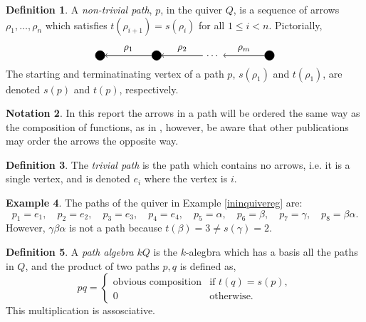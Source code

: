 \documentclass[11.5pt, twoside, a4paper, titlepage]{report}
\theoremstyle{definition}
\newtheorem{mydef}{Definition}[section]
\newtheorem{note}[mydef]{Notation}
\newtheorem{eg}[mydef]{Example}
\theoremstyle{plain}
\begin{document}
\begin{mydef}
A \emph{non-trivial path}, $p$, in the quiver $Q$,  is a sequence of arrows $\rho_1, \dots, \rho_n$ which satisfies $t(\rho_{i+1})=s(\rho_i)$ for all $1\leq i <n$. Pictorially, 
\begin{equation*}
\begin{tikzpicture}[->,-latex, auto, every path/.style={->, semithick}, main node/.style={draw, circle, fill}]
\node	[main node]		(1) at (0,0)		{};
\node	[main node]		(2) at (2,0)		{};
\node				(3) at (4,0)		{\dots};
\node [main node]		(4) at (6,0)		{};

\draw (2) edge node [auto, swap] {$\rho_1$} (1);
\draw (3) edge node [auto, swap] {$\rho_2$} (2);
\draw (4) edge node [auto, swap] {$\rho_m$} (3);
\end{tikzpicture}
\end{equation*}
 The starting and terminatinating vertex of a path $p$, $s(\rho_1)$ and $t(\rho_1)$, are denoted $s(p)$ and $t(p)$, respectively.
\end{mydef}

\begin{note}
In this report the arrows in a path will be ordered the same way as the composition of functions, as in \cite{CB2}, however, be aware that other publications may order the arrows the opposite way.
\end{note}

\begin{mydef}
The \emph{trivial path} is the path which contains no arrows, i.e. it is a single vertex, and is denoted $e_i$ where the vertex is $i$.
\end{mydef}

\begin{eg} \label{ininpatheg}
The paths of the quiver in Example \ref{ininquivereg} are:
\begin{equation*}
p_1=e_1, \quad p_2=e_2, \quad p_3=e_3, \quad p_4=e_4, \quad p_5=\alpha, \quad p_6=\beta, \quad p_7=\gamma, \quad p_8=\beta\alpha.
\end{equation*}
However, $\gamma\beta\alpha$ is not a path because $t(\beta)=3\neq s(\gamma)=2$.
\end{eg}

\begin{mydef}
A \emph{path algebra} $kQ$ is the $k$-alegbra which has a basis all the paths in $Q$, and the product of two paths $p,q$ is defined as,
\begin{equation*}
pq=\begin{cases}
\text{obvious composition} & \text{if } t(q)=s(p),\\
0 & \text{otherwise.}
\end{cases}
\end{equation*}
This multiplication is assosciative.
\end{mydef}
\end{document}
